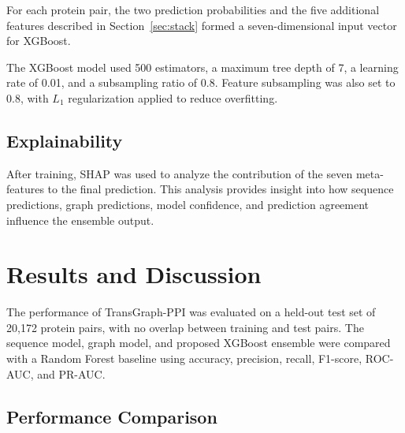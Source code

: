 \documentclass[conference]{IEEEtran}
\begin{document}
For each protein pair, the two prediction probabilities and the five additional
features described in Section~\ref{sec:stack} formed a seven-dimensional input
vector for XGBoost.

The XGBoost model used 500 estimators, a maximum tree depth of 7, a learning
rate of 0.01, and a subsampling ratio of 0.8. Feature subsampling was also set
to 0.8, with $L_1$ regularization applied to reduce overfitting.

\subsection{Explainability}
After training, SHAP was used to analyze the contribution of the seven
meta-features to the final prediction. This analysis provides insight into how
sequence predictions, graph predictions, model confidence, and prediction
agreement influence the ensemble output.

\section{Results and Discussion}\label{sec:results}
The performance of TransGraph-PPI was evaluated on a held-out test set of
20,172 protein pairs, with no overlap between training and test pairs. The
sequence model, graph model, and proposed XGBoost ensemble were compared with a
Random Forest baseline using accuracy, precision, recall, F1-score, ROC-AUC,
and PR-AUC.

\subsection{Performance Comparison}
\end{document}

